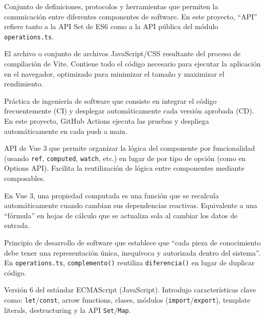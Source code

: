 \documentclass[11pt,a4paper]{article}
\begin{document}
\begin{description}[leftmargin=1.5cm, style=nextline]
    \item[\textbf{API (Application Programming Interface):}] Conjunto de definiciones, protocolos y herramientas que permiten la comunicación entre diferentes componentes de software. En este proyecto, ``API'' refiere tanto a la API Set de ES6 como a la API pública del módulo \texttt{operations.ts}.
    
    \item[\textbf{Bundle:}] El archivo o conjunto de archivos JavaScript/CSS resultante del proceso de compilación de Vite. Contiene todo el código necesario para ejecutar la aplicación en el navegador, optimizado para minimizar el tamaño y maximizar el rendimiento.
    
    \item[\textbf{CI/CD (Continuous Integration / Continuous Delivery):}] Práctica de ingeniería de software que consiste en integrar el código frecuentemente (CI) y desplegar automáticamente cada versión aprobada (CD). En este proyecto, GitHub Actions ejecuta las pruebas y despliega automáticamente en cada push a main.
    
    \item[\textbf{Composition API:}] API de Vue 3 que permite organizar la lógica del componente por funcionalidad (usando \texttt{ref}, \texttt{computed}, \texttt{watch}, etc.) en lugar de por tipo de opción (como en Options API). Facilita la reutilización de lógica entre componentes mediante composables.
    
    \item[\textbf{Computed (propiedad computada):}] En Vue 3, una propiedad computada es una función que se recalcula automáticamente cuando cambian sus dependencias reactivas. Equivalente a una ``fórmula'' en hojas de cálculo que se actualiza sola al cambiar los datos de entrada.
    
    \item[\textbf{DRY (Don't Repeat Yourself):}] Principio de desarrollo de software que establece que ``cada pieza de conocimiento debe tener una representación única, inequívoca y autorizada dentro del sistema''. En \texttt{operations.ts}, \texttt{complemento()} reutiliza \texttt{diferencia()} en lugar de duplicar código.
    
    \item[\textbf{ES6 (ECMAScript 2015):}] Versión 6 del estándar ECMAScript (JavaScript). Introdujo características clave como: \texttt{let}/\texttt{const}, arrow functions, clases, módulos (\texttt{import}/\texttt{export}), template literals, destructuring y la API \texttt{Set}/\texttt{Map}.
    

\end{description}
\end{document}
